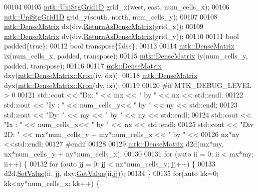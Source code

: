 \begin{DoxyCode}
00104 
00105   \hyperlink{classmtk_1_1UniStgGrid1D}{mtk::UniStgGrid1D} grid\_x(west, east, num\_cells\_x);
00106   \hyperlink{classmtk_1_1UniStgGrid1D}{mtk::UniStgGrid1D} grid\_y(south, north, num\_cells\_y);
00107 
00108   \hyperlink{classmtk_1_1DenseMatrix}{mtk::DenseMatrix} dx(div.\hyperlink{classmtk_1_1Div1D_a213fddbaaf86e4840c6a9649b69c2d49}{ReturnAsDenseMatrix}(grid\_x));
00109   \hyperlink{classmtk_1_1DenseMatrix}{mtk::DenseMatrix} dy(div.\hyperlink{classmtk_1_1Div1D_a213fddbaaf86e4840c6a9649b69c2d49}{ReturnAsDenseMatrix}(grid\_y));
00110 
00111   \textcolor{keywordtype}{bool} padded\{\textcolor{keyword}{true}\};
00112   \textcolor{keywordtype}{bool} transpose\{\textcolor{keyword}{false}\};
00113 
00114   \hyperlink{classmtk_1_1DenseMatrix}{mtk::DenseMatrix} ix(num\_cells\_x, padded, transpose);
00115   \hyperlink{classmtk_1_1DenseMatrix}{mtk::DenseMatrix} iy(num\_cells\_y, padded, transpose);
00116 
00117   \hyperlink{classmtk_1_1DenseMatrix}{mtk::DenseMatrix} dxy(\hyperlink{classmtk_1_1DenseMatrix_a01d3d8bd502870f93bf3a88a0cc5fb49}{mtk::DenseMatrix::Kron}(iy, dx));
00118   \hyperlink{classmtk_1_1DenseMatrix}{mtk::DenseMatrix} dyx(\hyperlink{classmtk_1_1DenseMatrix_a01d3d8bd502870f93bf3a88a0cc5fb49}{mtk::DenseMatrix::Kron}(dy, ix));
00119 
00120 \textcolor{preprocessor}{  #if MTK\_DEBUG\_LEVEL > 0}
00121   std::cout << \textcolor{stringliteral}{"Dx: "} << mx << \textcolor{stringliteral}{" by "} << nx << std::endl;
00122   std::cout << \textcolor{stringliteral}{"Iy : "} << num\_cells\_y<< \textcolor{stringliteral}{" by "} << ny  << std::endl;
00123   std::cout << \textcolor{stringliteral}{"Dy: "} << my << \textcolor{stringliteral}{" by "} << ny << std::endl;
00124   std::cout << \textcolor{stringliteral}{"Ix : "} << num\_cells\_x<< \textcolor{stringliteral}{" by "} << nx  << std::endl;
00125   std::cout << \textcolor{stringliteral}{"Div 2D: "} << mx*num\_cells\_y + my*num\_cells\_x << \textcolor{stringliteral}{" by "} <<
00126     nx*ny <<std::endl;
00127 \textcolor{preprocessor}{  #endif}
00128 
00129   \hyperlink{classmtk_1_1DenseMatrix}{mtk::DenseMatrix} d2d(mx*my, nx*num\_cells\_y + ny*num\_cells\_x);
00130 
00131   \textcolor{keywordflow}{for} (\textcolor{keyword}{auto} ii = 0; ii < mx*my; ii++) \{
00132     \textcolor{keywordflow}{for} (\textcolor{keyword}{auto} jj = 0; jj < nx*num\_cells\_y; jj++) \{
00133       d2d.\hyperlink{classmtk_1_1DenseMatrix_a784ce5784109ac86bfb9d8562b334b13}{SetValue}(ii, jj, dxy.\hyperlink{classmtk_1_1DenseMatrix_a4b23ecbebd970b5eea915dbb50691024}{GetValue}(ii,jj));
00134     \}
00135     \textcolor{keywordflow}{for}(\textcolor{keyword}{auto} kk=0; kk<ny*num\_cells\_x; kk++) \{

\end{DoxyCode}
